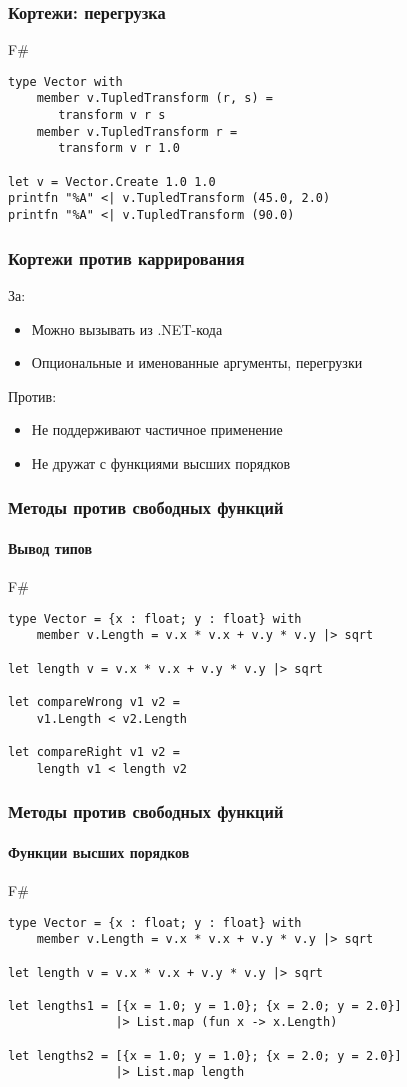 \documentclass[xetex,mathserif,serif]{beamer}
\begin{document}
	\begin{frame}[fragile]
		\frametitle{Кортежи: перегрузка}
		\begin{exampleblock}{F\#}
			\begin{verbatim}
type Vector with
    member v.TupledTransform (r, s) = 
       transform v r s
    member v.TupledTransform r = 
       transform v r 1.0

let v = Vector.Create 1.0 1.0
printfn "%A" <| v.TupledTransform (45.0, 2.0)
printfn "%A" <| v.TupledTransform (90.0)
			\end{verbatim}
		\end{exampleblock}
\end{frame}

	\begin{frame}
		\frametitle{Кортежи против каррирования}
		За:
		\begin{itemize}
			\item Можно вызывать из .NET-кода
			\item Опциональные и именованные аргументы, перегрузки
		\end{itemize}
		Против:
		\begin{itemize}
			\item Не поддерживают частичное применение
			\item Не дружат с функциями высших порядков
		\end{itemize}
	\end{frame}

	\begin{frame}[fragile]
		\frametitle{Методы против свободных функций}
		\framesubtitle{Вывод типов}
		\begin{exampleblock}{F\#}
			\begin{verbatim}
type Vector = {x : float; y : float} with
    member v.Length = v.x * v.x + v.y * v.y |> sqrt
   
let length v = v.x * v.x + v.y * v.y |> sqrt

let compareWrong v1 v2 =
    v1.Length < v2.Length

let compareRight v1 v2 =
    length v1 < length v2
			\end{verbatim}
		\end{exampleblock}
\end{frame}

	\begin{frame}[fragile]
		\frametitle{Методы против свободных функций}
		\framesubtitle{Функции высших порядков}
		\begin{exampleblock}{F\#}
			\begin{verbatim}
type Vector = {x : float; y : float} with
    member v.Length = v.x * v.x + v.y * v.y |> sqrt

let length v = v.x * v.x + v.y * v.y |> sqrt

let lengths1 = [{x = 1.0; y = 1.0}; {x = 2.0; y = 2.0}]
               |> List.map (fun x -> x.Length)

let lengths2 = [{x = 1.0; y = 1.0}; {x = 2.0; y = 2.0}]
               |> List.map length
			\end{verbatim}
		\end{exampleblock}
\end{frame}
\end{document}
